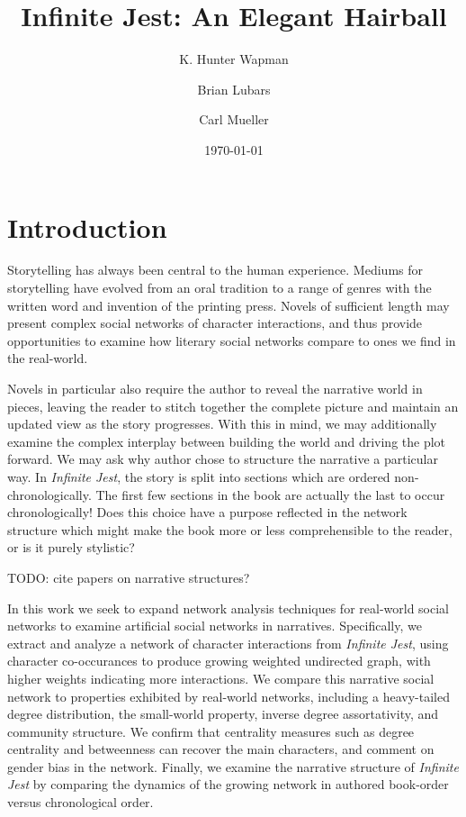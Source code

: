 \documentclass[sigconf]{acmart}
\title{Infinite Jest: An Elegant Hairball}
\author{
  K. Hunter Wapman
  \and
  Brian Lubars
  \and
  Carl Mueller
}
\date{\today}
\newcommand{\infinitejest}{{\em Infinite Jest}\xspace}
\begin{document}
\maketitle

\section{Introduction}

Storytelling has always been central to the human experience. Mediums for storytelling have evolved from an oral tradition to a range of genres with the written word and invention of the printing press. 
Novels of sufficient length may present complex social networks of character interactions, and thus provide opportunities to examine how literary social networks compare to ones we find in the real-world. 

Novels in particular also require the author to reveal the narrative world in pieces, leaving the reader to stitch together the complete picture and maintain an updated view as the story progresses. 
With this in mind, we may additionally examine the complex interplay between building the world and driving the plot forward. 
We may ask why author chose to structure the narrative a particular way. 
In \infinitejest, the story is split into sections which are ordered non-chronologically. 
The first few sections in the book are actually the last to occur chronologically!
Does this choice have a purpose reflected in the network structure which might make the book more or less comprehensible to the reader, or is it purely stylistic?

TODO: cite papers on narrative structures? 

In this work we seek to expand network analysis techniques for real-world social networks to examine artificial social networks in narratives.
Specifically, we extract and analyze a network of character interactions from \infinitejest, using character co-occurances to produce growing weighted undirected graph, with higher weights indicating more interactions.
We compare this narrative social network to properties exhibited by real-world networks, including a heavy-tailed degree distribution, the small-world property, inverse degree assortativity, and community structure. 
We confirm that centrality measures such as degree centrality and betweenness can recover the main characters, and comment on gender bias in the network.
Finally, we examine the narrative structure of \infinitejest by comparing the dynamics of the growing network in authored book-order versus chronological order.
\end{document}
